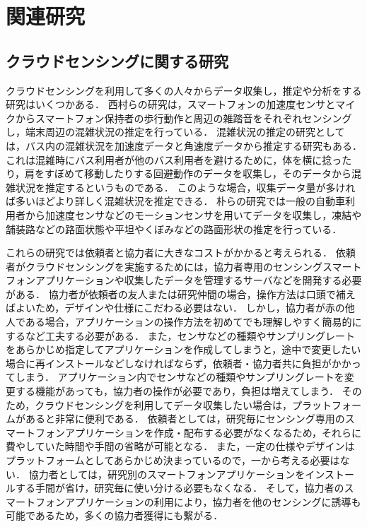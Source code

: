 \thispagestyle{myheadings}
\chapter{関連研究}
\label{sec:format}


\section{クラウドセンシングに関する研究}
\label{sec:format_thesis}
クラウドセンシングを利用して多くの人々からデータ収集し，推定や分析をする研究はいくつかある．
西村らの研究\cite{ura}は，スマートフォンの加速度センサとマイクからスマートフォン保持者の歩行動作と周辺の雑踏音をそれぞれセンシングし，端末周辺の混雑状況の推定を行っている．
混雑状況の推定の研究としては，バス内の混雑状況を加速度データと角速度データから推定する研究\cite{hoso}もある．
これは混雑時にバス利用者が他のバス利用者を避けるために，体を横に捻ったり，肩をすぼめて移動したりする回避動作のデータを収集し，そのデータから混雑状況を推定するというものである．
このような場合，収集データ量が多ければ多いほどより詳しく混雑状況を推定できる．
朴らの研究\cite{paku}では一般の自動車利用者から加速度センサなどのモーションセンサを用いてデータを収集し，凍結や舗装路などの路面状態や平坦やくぼみなどの路面形状の推定を行っている．

これらの研究では依頼者と協力者に大きなコストがかかると考えられる．
依頼者がクラウドセンシングを実施するためには，協力者専用のセンシングスマートフォンアプリケーションや収集したデータを管理するサーバなどを開発する必要がある．
協力者が依頼者の友人または研究仲間の場合，操作方法は口頭で補えばよいため，デザインや仕様にこだわる必要はない．
しかし，協力者が赤の他人である場合，アプリケーションの操作方法を初めてでも理解しやすく簡易的にするなど工夫する必要がある．
また，センサなどの種類やサンプリングレートをあらかじめ指定してアプリケーションを作成してしまうと，途中で変更したい場合に再インストールなどしなければならず，依頼者・協力者共に負担がかかってしまう．
アプリケーション内でセンサなどの種類やサンプリングレートを変更する機能があっても，協力者の操作が必要であり，負担は増えてしまう．
そのため，クラウドセンシングを利用してデータ収集したい場合は，プラットフォームがあると非常に便利である．
依頼者としては，研究毎にセンシング専用のスマートフォンアプリケーションを作成・配布する必要がなくなるため，それらに費やしていた時間や手間の省略が可能となる．
また，一定の仕様やデザインはプラットフォームとしてあらかじめ決まっているので，一から考える必要はない．
協力者としては，研究別のスマートフォンアプリケーションをインストールする手間が省け，研究毎に使い分ける必要もなくなる．
そして，協力者のスマートフォンアプリケーションの利用により，協力者を他のセンシングに誘導も可能であるため，多くの協力者獲得にも繋がる．


